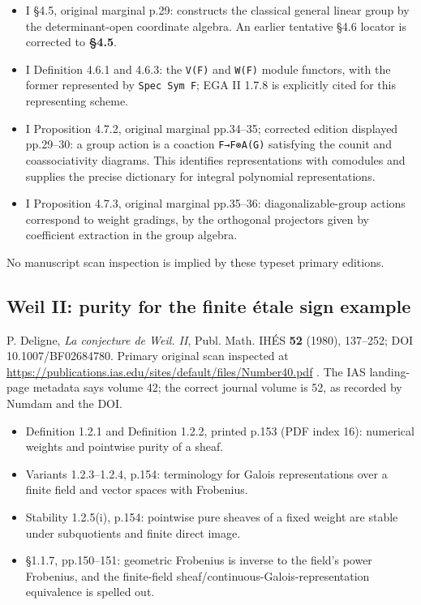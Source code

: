 \documentclass[
  10pt,
]{article}
\providecommand{\tightlist}{%
  \setlength{\itemsep}{0pt}\setlength{\parskip}{0pt}}
\providecommand{\tightlist}{\setlength{\itemsep}{0pt}\setlength{\parskip}{0pt}}
\begin{document}
\begin{itemize}
\tightlist
\item
  I §4.5, original marginal p.29: constructs the classical general
  linear group by the determinant-open coordinate algebra. An earlier
  tentative §4.6 locator is corrected to \textbf{§4.5}.
\item
  I Definition 4.6.1 and 4.6.3: the
  \texttt{\small V(\allowbreak{}F)\allowbreak{}} and
  \texttt{\small W(\allowbreak{}F)\allowbreak{}} module functors, with
  the former represented by \texttt{\small Spec Sym F}; EGA II 1.7.8 is
  explicitly cited for this representing scheme.
\item
  I Proposition 4.7.2, original marginal pp.34--35; corrected edition
  displayed pp.29--30: a group action is a coaction
  \texttt{\small F→\allowbreak{}F⊗\allowbreak{}A(\allowbreak{}G)\allowbreak{}}
  satisfying the counit and coassociativity diagrams. This identifies
  representations with comodules and supplies the precise dictionary for
  integral polynomial representations.
\item
  I Proposition 4.7.3, original marginal pp.35--36: diagonalizable-group
  actions correspond to weight gradings, by the orthogonal projectors
  given by coefficient extraction in the group algebra.
\end{itemize}

No manuscript scan inspection is implied by these typeset primary
editions.

\subsection{Weil II: purity for the finite étale sign
example}\label{weil-ii-purity-for-the-finite-uxe9tale-sign-example}

P. Deligne, \emph{La conjecture de Weil. II}, Publ. Math. IHÉS
\textbf{52} (1980), 137--252; DOI 10.1007/BF02684780. Primary original
scan inspected at
\url{https://publications.ias.edu/sites/default/files/Number40.pdf} .
The IAS landing-page metadata says volume 42; the correct journal volume
is 52, as recorded by Numdam and the DOI.

\begin{itemize}
\tightlist
\item
  Definition 1.2.1 and Definition 1.2.2, printed p.153 (PDF index 16):
  numerical weights and pointwise purity of a sheaf.
\item
  Variants 1.2.3--1.2.4, p.154: terminology for Galois representations
  over a finite field and vector spaces with Frobenius.
\item
  Stability 1.2.5(i), p.154: pointwise pure sheaves of a fixed weight
  are stable under subquotients and finite direct image.
\item
  §1.1.7, pp.150--151: geometric Frobenius is inverse to the field's
  power Frobenius, and the finite-field
  sheaf/continuous-Galois-representation equivalence is spelled out.
\end{itemize}
\end{document}
